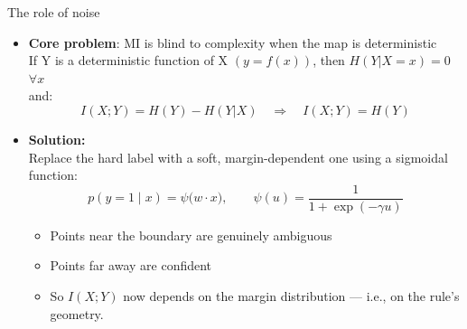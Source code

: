 \documentclass[aspectratio=169,11pt]{beamer}
\begin{document}

\begin{frame}{The role of noise}
\begin{itemize}
    \item \textbf{Core problem}:
    MI is blind to complexity when the map is deterministic \\ 
    If Y is a deterministic function of X $(y=f(x))$, then $H(Y|X=x)= 0$ $\forall x$ \\ and:
    $$I(X;Y)=H(Y) - H(Y|X) \quad \Rightarrow \quad I(X;Y) = H(Y)$$  
    \item \textbf{Solution:} \\
    Replace the hard label with a soft, margin-dependent one using a sigmoidal function:
    $$ p(y=1\mid x) = \psi\big(w \cdot x), \qquad \psi(u) = \frac{1}{1+\exp(-\gamma u)}$$
    \begin{itemize}
        \item Points near the boundary are genuinely ambiguous
        \item Points far away are confident
        \item So $I(X;Y)$ now depends on the margin distribution — i.e., on the rule's geometry.
    \end{itemize}
\end{itemize}

\end{frame}
\end{document}
